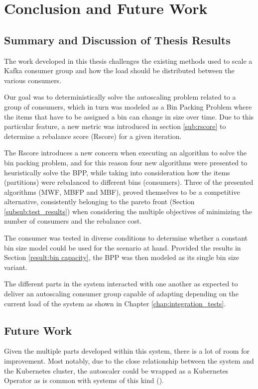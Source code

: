 \chapter{Conclusion and Future Work} 
\label{chap:conclusions}

\section{Summary and Discussion of Thesis Results}

The work developed in this thesis challenges the existing methods used to scale
a Kafka consumer group and how the load should be distributed between the
various consumers.

Our goal was to deterministically solve the autoscaling problem related to a
group of consumers, which in turn was modeled as a Bin Packing Problem where the
items that have to be assigned a bin can change in size over time. Due to this
particular feature, a new metric was introduced in section \ref{sub:rscore} to
determine a rebalance score (Rscore) for a given iteration. 

The Rscore introduces a new concern when executing an algorithm to solve the bin
packing problem, and for this reason four new algorithms were presented to
heuristically solve the BPP, while taking into consideration how the items
(partitions) were rebalanced to different bins (consumers). Three of the
presented algorithms (MWF, MBFP and MBF), proved themselves to be a competitive
alternative, consistently belonging to the pareto front (Section
\ref{subsub:test_results}) when considering the multiple objectives of
minimizing the number of consumers and the rebalance cost.

The consumer was tested in diverse conditions to determine whether a constant
bin size model could be used for the scenario at hand. Provided the results in
Section \ref{result:bin capacity}, the BPP was then modeled as its single bin
size variant.

The different parts in the system interacted with one another as expected to
deliver an autoscaling consumer group capable of adapting depending on the
current load of the system as shown in Chapter \ref{chap:integration_tests}.

\section{Future Work}

Given the multiple parts developed within this system, there is a lot of room
for improvement. Most notably, due to the close relationship between the system
and the Kubernetes cluster, the autoscaler could be wrapped as a Kubernetes
Operator \cite{KuberenetesOperator} as is common with systems of this kind
(\cite{Kubegres, PulumiOperator, KEDA}).

